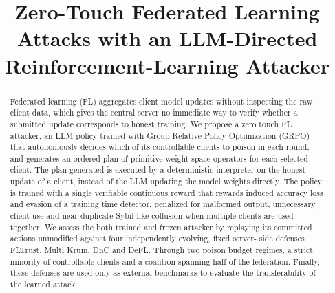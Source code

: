 \documentclass[conference,9pt]{IEEEtran}
\begin{document}
\title{Zero-Touch Federated Learning Attacks with an LLM-Directed\\ Reinforcement-Learning Attacker}

\author{
}

\maketitle

\begin{abstract}
Federated learning (FL) aggregates client model updates without inspecting the raw client data, which gives the central server no immediate way to verify whether a submitted update corresponds to honest training. We propose a zero touch FL attacker, an LLM policy trained with Group Relative Policy Optimization (GRPO) that autonomously decides which of its controllable clients to poison in each round, and generates an ordered plan of primitive weight space operators for each selected client. The plan generated is executed by a deterministic interpreter on the honest update of a client, instead of the LLM updating the model weights directly.
The policy is trained with a single verifiable continuous reward that rewards induced accuracy loss and evasion of a training time detector, penalized for malformed output, unnecessary client use and near duplicate Sybil like collusion when multiple clients are used together. We assess the both trained and frozen attacker by replaying its committed actions unmodified against four independently evolving, fixed server- side defenses FLTrust, Multi Krum, DnC and DeFL. Through two poison budget regimes, a strict minority of controllable clients and a coalition spanning half of the federation. Finally, these defenses are used only as external benchmarks to evaluate the transferability of the learned attack.

\end{abstract}
\end{document}
